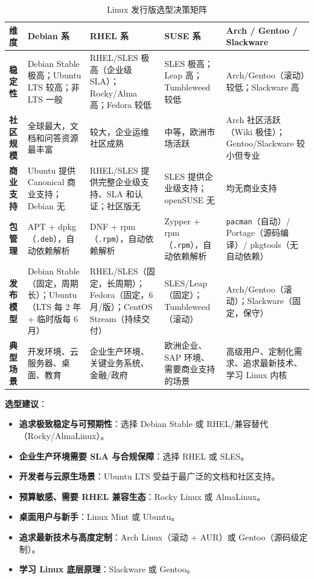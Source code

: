 \documentclass[12pt,UTF8]{ctexbook}
\begin{document}
\begin{table}[H]
	\centering
	\small
	\begin{tabularx}{\textwidth}{>{\bfseries}l X X X X}
		\toprule
		\textbf{维度} & \textbf{Debian 系} & \textbf{RHEL 系} & \textbf{SUSE 系} & \textbf{Arch / Gentoo / Slackware} \\
		\midrule
		稳定性 & Debian Stable 极高；Ubuntu LTS 较高；非 LTS 一般 & RHEL/SLES 极高（企业级 SLA）；Rocky/Alma 高；Fedora 较低 & SLES 极高；Leap 高；Tumbleweed 较低 & Arch/Gentoo（滚动）较低；Slackware 高 \\
		\addlinespace
		社区规模 & 全球最大，文档和问答资源最丰富 & 较大，企业运维社区成熟 & 中等，欧洲市场活跃 & Arch 社区活跃（Wiki 极佳）；Gentoo/Slackware 较小但专业 \\
		\addlinespace
		商业支持 & Ubuntu 提供 Canonical 商业支持；Debian 无 & RHEL/SLES 提供完整企业级支持、SLA 和认证；社区版无 & SLES 提供企业级支持；openSUSE 无 & 均无商业支持 \\
		\addlinespace
		包管理 & APT + dpkg（\texttt{.deb}），自动依赖解析 & DNF + rpm（\texttt{.rpm}），自动依赖解析 & Zypper + rpm（\texttt{.rpm}），自动依赖解析 & \texttt{pacman}（自动）/ Portage（源码编译）/ pkgtools（无自动依赖） \\
		\addlinespace
		发布模型 & Debian Stable（固定，周期长）；Ubuntu（LTS 每 2 年 + 临时版每 6 月） & RHEL/SLES（固定，长周期）；Fedora（固定，6 月/版）；CentOS Stream（持续交付） & SLES/Leap（固定）；Tumbleweed（滚动） & Arch/Gentoo（滚动）；Slackware（固定，保守） \\
		\addlinespace
		典型场景 & 开发环境、云服务器、桌面、教育 & 企业生产环境、关键业务系统、金融/政府 & 欧洲企业、SAP 环境、需要商业支持的场景 & 高级用户、定制化需求、追求最新技术、学习 Linux 内核 \\
		\bottomrule
	\end{tabularx}
	\caption{Linux 发行版选型决策矩阵}
	\label{tab:decision-matrix}
\end{table}
	
\textbf{选型建议}：
\begin{itemize}[leftmargin=*, nosep]
	\item \textbf{追求极致稳定与可预期性}：选择 Debian Stable 或 RHEL/兼容替代（Rocky/AlmaLinux）。
	\item \textbf{企业生产环境需要 SLA 与合规保障}：选择 RHEL 或 SLES。
	\item \textbf{开发者与云原生场景}：Ubuntu LTS 受益于最广泛的文档和社区支持。
	\item \textbf{预算敏感、需要 RHEL 兼容生态}：Rocky Linux 或 AlmaLinux。
	\item \textbf{桌面用户与新手}：Linux Mint 或 Ubuntu。
	\item \textbf{追求最新技术与高度定制}：Arch Linux（滚动 + AUR）或 Gentoo（源码级定制）。
	\item \textbf{学习 Linux 底层原理}：Slackware 或 Gentoo。
\end{itemize}
	
\end{document}
